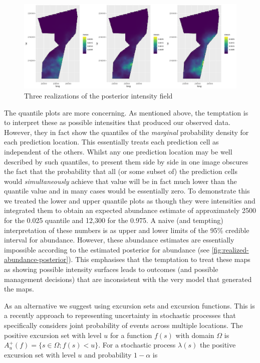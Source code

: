 \documentclass[preprint,12pt]{elsarticle}
\begin{document}
\begin{figure}
	\includegraphics[scale=0.35]{figures/intensity_realized.png}
	\caption{Three realizations of the posterior intensity field}
	\label{fig:intensity-realizations}
\end{figure}

The quantile plots are more concerning.  As mentioned above, the temptation is to interpret these as possible intensities that produced our observed data.  However, they in fact show the quantiles of the \textit{marginal} probability density for each prediction location.  This essentially treats each prediction cell as independent of the others. Whilst any one prediction location may be well described by such quantiles, to present them side by side in one image obscures the fact that the probability that all (or some subset of) the prediction cells would \textit{simultaneously} achieve that value will be in fact much lower than the quantile value and in many cases would be essentially zero.  To demonstrate this we treated the lower and upper quantile plots as though they were intensities and integrated them to obtain an expected abundance estimate of approximately 2500 for the 0.025 quantile and 12,300 for the 0.975.  A naive (and tempting) interpretation of these numbers is as upper and lower limits of the 95\% credible interval for abundance. However, these abundance estimates are essentially impossible according to the estimated posterior for abundance (see \autoref{fig:realized-abundance-posterior}).  This emphasises that the temptation to treat these maps as showing possible intensity surfaces leads to outcomes (and possible management decisions) that are inconsistent with the very model that generated the maps.

As an alternative we suggest using excursion sets and excursion functions.  This is a recently approach to representing uncertainty in stochastic processes that specifically considers
joint probability of events across multiple locations.  The positive excursion set with level $u$ for a function $f(s)$ with domain $\Omega$ is $A_u^{+}(f) = \{ s \in \Omega ; f(s) < u \}$.  For a stochastic process $\lambda(s)$ the positive excursion set with level $u$ and probability $1 - \alpha$ is
\end{document}
